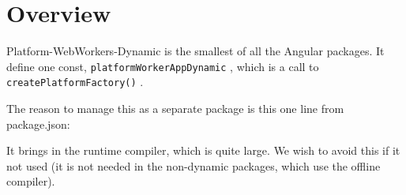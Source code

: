 \section{Overview}

Platform-WebWorkers-Dynamic is the smallest of all the Angular packages. It define
one const,
\texttt{platformWorkerAppDynamic}
, which is a call to
\texttt{createPlatformFactory()}
.

The reason to manage this as a separate package is this one line from package.json:



It brings in the runtime compiler, which is quite large. We wish to avoid this if it not
used (it is not needed in the non-dynamic packages, which use the offline compiler).
